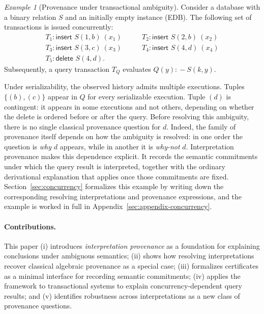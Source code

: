 \documentclass[acmsmall,nonacm]{acmart}
\theoremstyle{remark}
\newtheorem{example}{Example}
\numberwithin{definition}{section}
\numberwithin{theorem}{section}
\numberwithin{lemma}{section}
\numberwithin{corollary}{section}
\numberwithin{remark}{section}
\numberwithin{example}{section}
\numberwithin{observation}{section}
\numberwithin{assumption}{section}
\newcommand{\drule}{\mathrel{:\!-}}
\begin{document}
\begin{example}[Provenance under transactional ambiguity]
  \label{ex:example}
Consider a database with a binary relation $S$ 
and an initially empty instance (EDB).
The following set of transactions is issued concurrently:
\[
\begin{array}{ll}
T_1: \textsf{insert } S(1,b) \ (x_1) \qquad &
T_2: \textsf{insert } S(2,b) \ (x_2)\\
T_3: \textsf{insert } S(3,c) \ (x_3) \qquad &
T_4: \textsf{insert } S(4,d) \ (x_4)\\
T_5: \textsf{delete } S(4,d). &
\end{array}
\]
Subsequently, a query transaction $T_Q$ evaluates $Q(y) \drule S(k,y)$.

Under serializability, the observed history admits multiple executions.
Tuples $\{(b), (c)\}$ appear in $Q$ for every serializable execution.
Tuple $(d)$ is contingent: it appears in some executions and not others, depending
on whether the delete is ordered before or after the query. Before resolving this
ambiguity, there is no single classical provenance question for $d$. Indeed,
the family of provenance itself depends on how the ambiguity is resolved: in 
one order the question is \emph{why} $d$ appears, while in another it is \emph{why-not} $d$.
Interpretation provenance makes this dependence explicit.
It records the semantic commitments under which the query result is interpreted,
together with the ordinary derivational explanation that applies once those
commitments are fixed.
Section~\ref{sec:concurrency} formalizes this example by writing down the corresponding
resolving interpretations and provenance expressions, and the example is 
worked in full in Appendix~\ref{sec:appendix-concurrency}.
\end{example}

\paragraph{Contributions.}
This paper (i) introduces \emph{interpretation provenance} as a foundation for explaining
conclusions under ambiguous semantics; (ii) shows how resolving interpretations recover classical
algebraic provenance as a special case; (iii) formalizes certificates as a minimal interface
for recording semantic commitments; (iv) applies the framework to transactional systems to
explain concurrency-dependent query results; and (v) identifies robustness across
interpretations as a new class of provenance questions.
\end{document}
